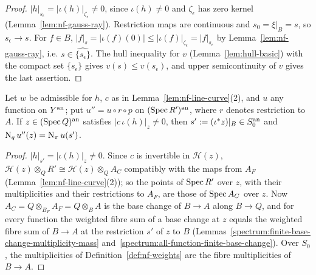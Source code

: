 \begin{proof}
$|h|_{s_\epsilon}=|\iota(h)|_{\zeta_\epsilon}\ne0$, since $\iota(h)\ne0$ and $\zeta_\epsilon$ has zero kernel
(Lemma~\ref{lem:nf-gauss-ray}). Restriction maps are continuous and $s_0=\xi|_B=s$, so $s_\epsilon\to s$. For $f\in B$,
$|f|_s=|\iota(f)(0)|\le|\iota(f)|_{\zeta_\epsilon}=|f|_{s_\epsilon}$ by Lemma~\ref{lem:nf-gauss-ray}, i.e.
$s\in\widehat{\{s_\epsilon\}}$. The hull inequality for $v$ (Lemma~\ref{lem:hull-basic}) with the compact set
$\{s_\epsilon\}$ gives $v(s)\le v(s_\epsilon)$, and upper semicontinuity of $v$ gives the last assertion.
\end{proof}

\begin{lemma}\label{lem:nf-generic-fibre}
\leanok
{}
Let $w$ be admissible for $h$, $c$ as in Lemma~\ref{lem:nf-line-curve}(2), and $u$ any function on $Y^{\mathrm{an}}$; put
$u''=u\circ r\circ p$ on $(\operatorname{Spec} R')^{\mathrm{an}}$, where $r$ denotes restriction to $A$. If $z\in(\operatorname{Spec} Q)^{\mathrm{an}}$ satisfies
$|c\,\iota(h)|_z\ne0$, then $s':=(\iota^*z)|_B\in S_0^{\mathrm{an}}$ and $\operatorname{N}_qu''(z)=\operatorname{N}_\pi u(s')$.
\end{lemma}

\begin{proof}
$|h|_{s'}=|\iota(h)|_z\ne0$. Since $c$ is invertible in $\mathcal H(z)$, $\mathcal H(z)\otimes_QR'\cong\mathcal H(z)\otimes_QA_C$
compatibly with the maps from $A_F$ (Lemma~\ref{lem:nf-line-curve}(2)); so the points of $\operatorname{Spec} R'$ over $z$, with their
multiplicities and their restrictions to $A_F$, are those of $\operatorname{Spec} A_C$ over $z$. Now $A_C=Q\otimes_{B_F}A_F=Q\otimes_BA$
is the base change of $B\to A$ along $B\to Q$, and for every function the weighted fibre sum of a base change at $z$
equals the weighted fibre sum of $B\to A$ at the restriction $s'$ of $z$ to $B$
(Lemmas~\ref{spectrum:finite-base-change-multiplicity-mass} and~\ref{spectrum:all-function-finite-base-change}). Over
$S_0$, the multiplicities of Definition~\ref{def:nf-weights} are the fibre multiplicities of $B\to A$.
\end{proof}

